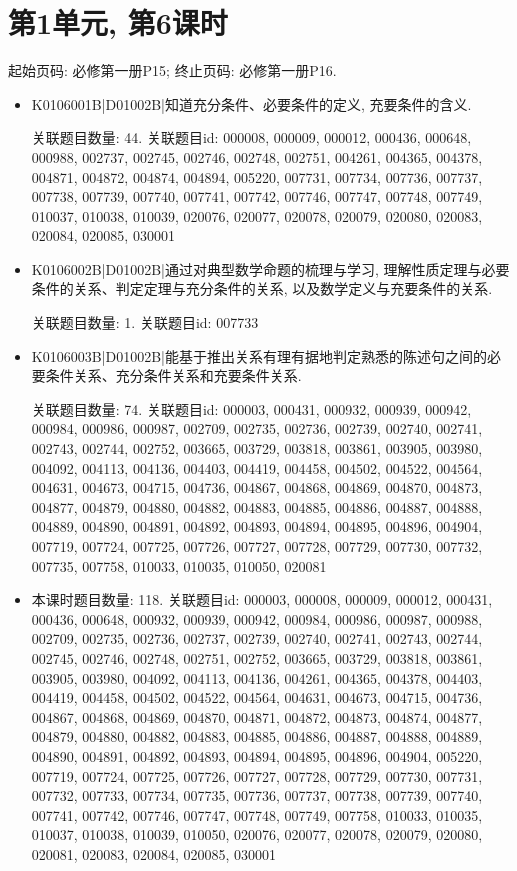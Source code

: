 \section*{第1单元, 第6课时}
起始页码: 必修第一册P15; 终止页码: 必修第一册P16.
\begin{itemize}
\item K0106001B|D01002B|知道充分条件、必要条件的定义, 充要条件的含义.

关联题目数量: 44. 关联题目id: 000008, 000009, 000012, 000436, 000648, 000988, 002737, 002745, 002746, 002748, 002751, 004261, 004365, 004378, 004871, 004872, 004874, 004894, 005220, 007731, 007734, 007736, 007737, 007738, 007739, 007740, 007741, 007742, 007746, 007747, 007748, 007749, 010037, 010038, 010039, 020076, 020077, 020078, 020079, 020080, 020083, 020084, 020085, 030001

\item K0106002B|D01002B|通过对典型数学命题的梳理与学习, 理解性质定理与必要条件的关系、判定定理与充分条件的关系, 以及数学定义与充要条件的关系.

关联题目数量: 1. 关联题目id: 007733

\item K0106003B|D01002B|能基于推出关系有理有据地判定熟悉的陈述句之间的必要条件关系、充分条件关系和充要条件关系.

关联题目数量: 74. 关联题目id: 000003, 000431, 000932, 000939, 000942, 000984, 000986, 000987, 002709, 002735, 002736, 002739, 002740, 002741, 002743, 002744, 002752, 003665, 003729, 003818, 003861, 003905, 003980, 004092, 004113, 004136, 004403, 004419, 004458, 004502, 004522, 004564, 004631, 004673, 004715, 004736, 004867, 004868, 004869, 004870, 004873, 004877, 004879, 004880, 004882, 004883, 004885, 004886, 004887, 004888, 004889, 004890, 004891, 004892, 004893, 004894, 004895, 004896, 004904, 007719, 007724, 007725, 007726, 007727, 007728, 007729, 007730, 007732, 007735, 007758, 010033, 010035, 010050, 020081

\item 本课时题目数量: 118. 关联题目id: 000003, 000008, 000009, 000012, 000431, 000436, 000648, 000932, 000939, 000942, 000984, 000986, 000987, 000988, 002709, 002735, 002736, 002737, 002739, 002740, 002741, 002743, 002744, 002745, 002746, 002748, 002751, 002752, 003665, 003729, 003818, 003861, 003905, 003980, 004092, 004113, 004136, 004261, 004365, 004378, 004403, 004419, 004458, 004502, 004522, 004564, 004631, 004673, 004715, 004736, 004867, 004868, 004869, 004870, 004871, 004872, 004873, 004874, 004877, 004879, 004880, 004882, 004883, 004885, 004886, 004887, 004888, 004889, 004890, 004891, 004892, 004893, 004894, 004895, 004896, 004904, 005220, 007719, 007724, 007725, 007726, 007727, 007728, 007729, 007730, 007731, 007732, 007733, 007734, 007735, 007736, 007737, 007738, 007739, 007740, 007741, 007742, 007746, 007747, 007748, 007749, 007758, 010033, 010035, 010037, 010038, 010039, 010050, 020076, 020077, 020078, 020079, 020080, 020081, 020083, 020084, 020085, 030001

\end{itemize}

